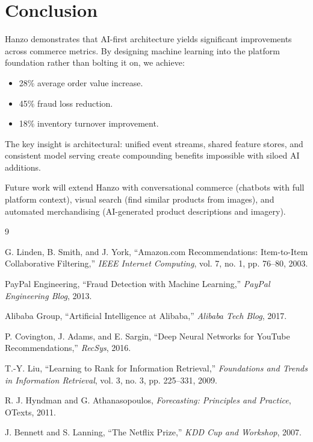 \section{Conclusion}


Hanzo demonstrates that AI-first architecture yields significant improvements across commerce metrics. By designing machine learning into the platform foundation rather than bolting it on, we achieve:
\begin{itemize}
\item 28\% average order value increase.
\item 45\% fraud loss reduction.
\item 18\% inventory turnover improvement.
\end{itemize}

The key insight is architectural: unified event streams, shared feature stores, and consistent model serving create compounding benefits impossible with siloed AI additions.

Future work will extend Hanzo with conversational commerce (chatbots with full platform context), visual search (find similar products from images), and automated merchandising (AI-generated product descriptions and imagery).

\begin{thebibliography}{9}

G. Linden, B. Smith, and J. York, ``Amazon.com Recommendations: Item-to-Item Collaborative Filtering,'' \textit{IEEE Internet Computing}, vol. 7, no. 1, pp. 76--80, 2003.

PayPal Engineering, ``Fraud Detection with Machine Learning,'' \textit{PayPal Engineering Blog}, 2013.

Alibaba Group, ``Artificial Intelligence at Alibaba,'' \textit{Alibaba Tech Blog}, 2017.

P. Covington, J. Adams, and E. Sargin, ``Deep Neural Networks for YouTube Recommendations,'' \textit{RecSys}, 2016.

T.-Y. Liu, ``Learning to Rank for Information Retrieval,'' \textit{Foundations and Trends in Information Retrieval}, vol. 3, no. 3, pp. 225--331, 2009.

R. J. Hyndman and G. Athanasopoulos, \textit{Forecasting: Principles and Practice}, OTexts, 2011.

J. Bennett and S. Lanning, ``The Netflix Prize,'' \textit{KDD Cup and Workshop}, 2007.

\end{thebibliography}

